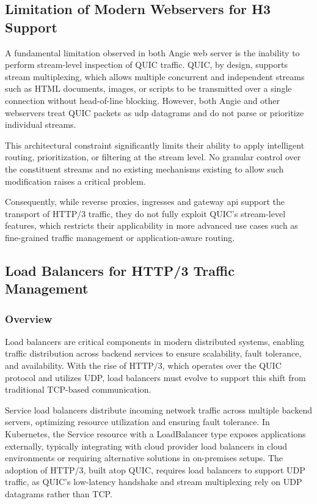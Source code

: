 \subsection{Limitation of Modern Webservers for H3 Support}
A fundamental limitation observed in both Angie web server is the inability to perform stream-level inspection of QUIC traffic. QUIC, by design, supports stream multiplexing, which allows multiple concurrent and independent streams such as HTML documents, images, or scripts to be transmitted over a single connection without head-of-line blocking. However, both Angie and other webservers treat QUIC packets as udp datagrams and do not parse or prioritize individual streams.

This architectural constraint significantly limits their ability to apply intelligent routing, prioritization, or filtering at the stream level. No granular control over the constituent streams and no existing mechanisms existing to allow such modification raises a critical problem. 

Consequently, while reverse proxies, ingresses and gateway api support the transport of HTTP/3 traffic, they do not fully exploit QUIC's stream-level features, which restricts their applicability in more advanced use cases such as fine-grained traffic management or application-aware routing.

\subsection{Load Balancers for HTTP/3 Traffic Management}
\subsubsection{Overview}
Load balancers are critical components in modern distributed systems, enabling traffic distribution across backend services to ensure scalability, fault tolerance, and availability. With the rise of HTTP/3, which operates over the QUIC protocol and utilizes UDP, load balancers must evolve to support this shift from traditional TCP-based communication.

Service load balancers distribute incoming network traffic across multiple backend servers, optimizing resource utilization and ensuring fault tolerance. In Kubernetes, the Service resource with a LoadBalancer type exposes applications externally, typically integrating with cloud provider load balancers in cloud environments or requiring alternative solutions in on-premises setups. The adoption of HTTP/3, built atop QUIC, requires load balancers to support UDP traffic, as QUIC's low-latency handshake and stream multiplexing rely on UDP datagrams rather than TCP.


